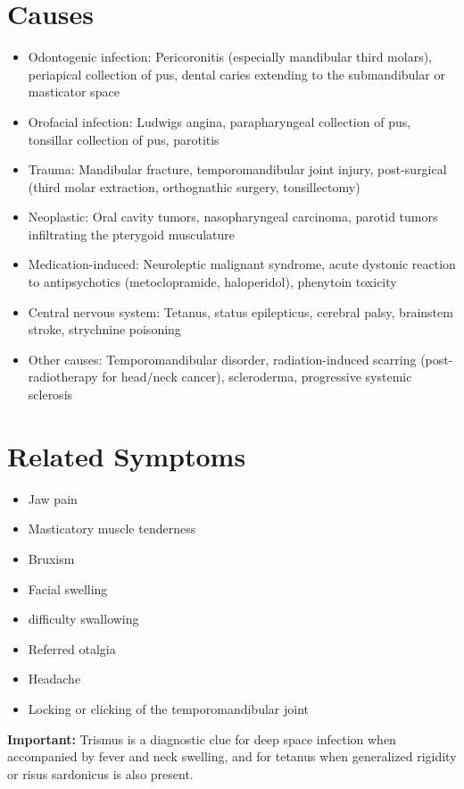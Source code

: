 \section*{Causes}
\begin{itemize}
  \item Odontogenic infection: Pericoronitis (especially mandibular third molars), periapical collection of pus, dental caries extending to the submandibular or masticator space
  \item Orofacial infection: Ludwigs angina, parapharyngeal collection of pus, tonsillar collection of pus, parotitis
  \item Trauma: Mandibular fracture, temporomandibular joint injury, post-surgical (third molar extraction, orthognathic surgery, tonsillectomy)
  \item Neoplastic: Oral cavity tumors, nasopharyngeal carcinoma, parotid tumors infiltrating the pterygoid musculature
  \item Medication-induced: Neuroleptic malignant syndrome, acute dystonic reaction to antipsychotics (metoclopramide, haloperidol), phenytoin toxicity
  \item Central nervous system: Tetanus, status epilepticus, cerebral palsy, brainstem stroke, strychnine poisoning
  \item Other causes: Temporomandibular disorder, radiation-induced scarring (post-radiotherapy for head/neck cancer), scleroderma, progressive systemic sclerosis
\end{itemize}

\section*{Related Symptoms}
\begin{itemize}
  \item Jaw pain
  \item Masticatory muscle tenderness
  \item Bruxism
  \item Facial swelling
  \item difficulty swallowing
  \item Referred otalgia
  \item Headache
  \item Locking or clicking of the temporomandibular joint
\end{itemize}
\textbf{Important:} Trismus is a diagnostic clue for deep space infection when accompanied by fever and neck swelling, and for tetanus when generalized rigidity or risus sardonicus is also present.

